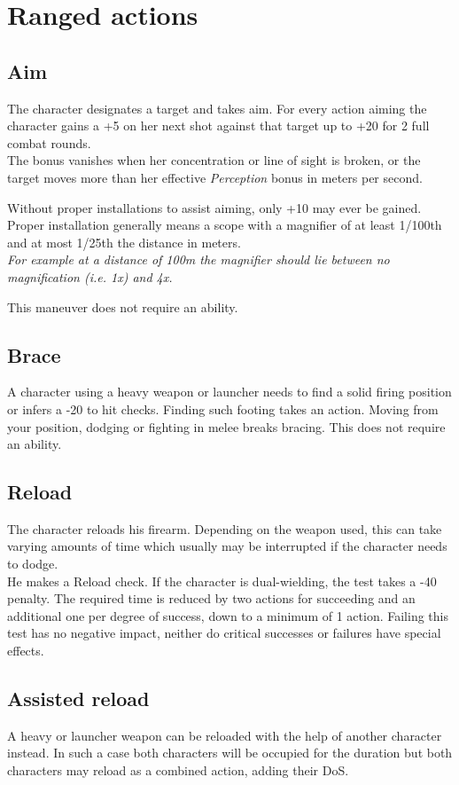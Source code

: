 \section{Ranged actions}
\subsection*{Aim}
The character designates a target and takes aim. For every action aiming the character gains a +5 on her next shot against that target up to +20 for 2 full combat rounds.\\
The bonus vanishes when her concentration or line of sight is broken, or the target moves more than her effective \emph{Perception} bonus in meters per second.
\par
Without proper installations to assist aiming, only +10 may ever be gained. Proper installation generally means a scope with a magnifier of at least 1/100th and at most 1/25th the distance in meters.\\
\textit{For example at a distance of 100m the magnifier should lie between no magnification (i.e. 1x) and 4x.}
\par
This maneuver does not require an ability.
\subsection*{Brace}
A character using a heavy weapon or launcher needs to find a solid firing position or infers a -20 to hit checks. Finding such footing takes an action. Moving from your position, dodging or fighting in melee breaks bracing. This does not require an ability.
\subsection*{Reload}
The character reloads his firearm. Depending on the weapon used, this can take varying amounts of time which usually may be interrupted if the character needs to dodge.\\
He makes a Reload check. If the character is dual-wielding, the test takes a -40 penalty. The required time is reduced by two actions for succeeding and an additional one per degree of success, down to a minimum of 1 action. Failing this test has no negative impact, neither do critical successes or failures have special effects.
\subsection*{Assisted reload}
A heavy or launcher weapon can be reloaded with the help of another character instead. In such a case both characters will be occupied for the duration but both characters may reload as a combined action, adding their DoS.
